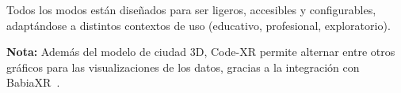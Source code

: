 \documentclass[a4paper, 12pt]{book}
\begin{document}
Todos los modos están diseñados para ser ligeros, accesibles y configurables, adaptándose a distintos contextos de uso (educativo, profesional, exploratorio).

\textbf{Nota:} Además del modelo de ciudad 3D, Code-XR permite alternar entre otros gráficos para las visualizaciones de los datos, gracias a la integración con BabiaXR~\cite{moreno2022babiaxr}.










\end{document}
